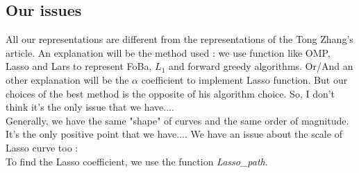 \documentclass{article}
\begin{document}
\subsection{Our issues}
All our representations are different from the representations of the Tong Zhang's article. An explanation will be the method used : we use function like OMP, Lasso and Lars to represent FoBa, $L_1$ and forward greedy algorithms. Or/And an other explanation will be the $\alpha$ coefficient to implement Lasso function. But our choices of the best method is the opposite of his algorithm choice. So, I don't think it's the only issue that we have....\\
Generally, we have the same "shape" of curves and the same order of magnitude. It's the only positive point that we have....
We have an issue about the scale of Lasso curve too : \\
To find the Lasso coefficient, we use the function \textit{Lasso\_path}.
\end{document}
